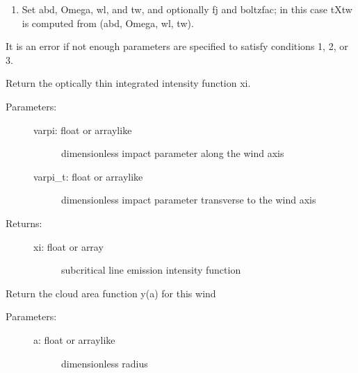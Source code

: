 \documentclass[letterpaper,10pt,english]{sphinxmanual}
\begin{document}
\begin{fulllineitems}
\begin{fulllineitems}
\begin{description}
\begin{enumerate}
\item {} 
Set abd, Omega, wl, and tw, and optionally fj and
boltzfac; in this case tXtw is computed from (abd,
Omega, wl, tw).

\end{enumerate}

It is an error if not enough parameters are specified to
satisfy conditions 1, 2, or 3.

\end{description}

\end{fulllineitems}


\begin{fulllineitems}
\label{fulldoc:despotic.winds.pwind.xi}
Return the optically thin integrated intensity function xi.
\begin{description}
\item[{Parameters:}] \leavevmode\begin{description}
\item[{varpi: float or arraylike}] \leavevmode
dimensionless impact parameter along the wind axis

\item[{varpi\_t: float or arraylike}] \leavevmode
dimensionless impact parameter transverse to the wind axis

\end{description}

\item[{Returns:}] \leavevmode\begin{description}
\item[{xi: float or array}] \leavevmode
subcritical line emission intensity function

\end{description}

\end{description}

\end{fulllineitems}


\begin{fulllineitems}
\label{fulldoc:despotic.winds.pwind.y}
Return the cloud area function y(a) for this wind
\begin{description}
\item[{Parameters:}] \leavevmode\begin{description}
\item[{a: float or arraylike}] \leavevmode
dimensionless radius


\end{description}
\end{description}
\end{fulllineitems}
\end{fulllineitems}
\end{document}
